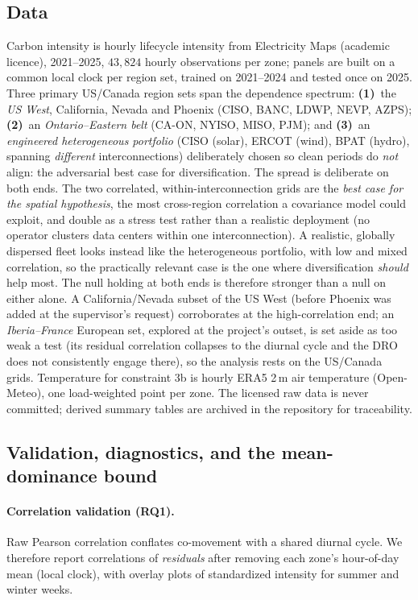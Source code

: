 \documentclass[12pt]{article}
\begin{document}
\subsection{Data}\label{sec:data}
Carbon intensity is hourly lifecycle intensity from Electricity Maps (academic
licence), 2021--2025, $43{,}824$ hourly observations per zone; panels are built on a
common local clock per region set, trained on 2021--2024 and tested once on 2025.
Three primary US/Canada region sets span the dependence spectrum:
\textbf{(1)}~the \emph{US West}, California, Nevada and Phoenix (CISO, BANC,
LDWP, NEVP, AZPS); \textbf{(2)}~an \emph{Ontario--Eastern belt} (CA-ON, NYISO,
MISO, PJM); and \textbf{(3)}~an \emph{engineered heterogeneous portfolio} (CISO
(solar), ERCOT (wind), BPAT (hydro), spanning \emph{different} interconnections)
deliberately chosen so clean periods do \emph{not} align: the adversarial best case
for diversification. The spread is deliberate on both ends. The two correlated,
within-interconnection grids are the \emph{best case for the spatial hypothesis}, the
most cross-region correlation a covariance model could exploit, and double as a stress
test rather than a realistic deployment (no operator clusters data centers within one
interconnection). A realistic, globally dispersed fleet looks instead like the
heterogeneous portfolio, with low and mixed correlation, so the practically relevant
case is the one where diversification \emph{should} help most. The null holding at
both ends is therefore stronger than a null on either alone. A California/Nevada subset
of the US West (before Phoenix was added at the supervisor's request) corroborates at the
high-correlation end; an \emph{Iberia--France} European set, explored at the project's
outset, is set aside as too weak a test (its residual correlation collapses to the diurnal
cycle and the DRO does not consistently engage there), so the analysis rests on the
US/Canada grids. Temperature for
constraint 3b is hourly ERA5 2\,m air temperature (Open-Meteo), one load-weighted
point per zone. The licensed raw data is never committed; derived summary tables
are archived in the repository for traceability.

\subsection{Validation, diagnostics, and the mean-dominance bound}\label{sec:diagnostics}
\paragraph{Correlation validation (RQ1).} Raw Pearson correlation conflates
co-movement with a shared diurnal cycle. We therefore report correlations of
\emph{residuals} after removing each zone's hour-of-day mean (local clock), with
overlay plots of standardized intensity for summer and winter weeks.
\end{document}
